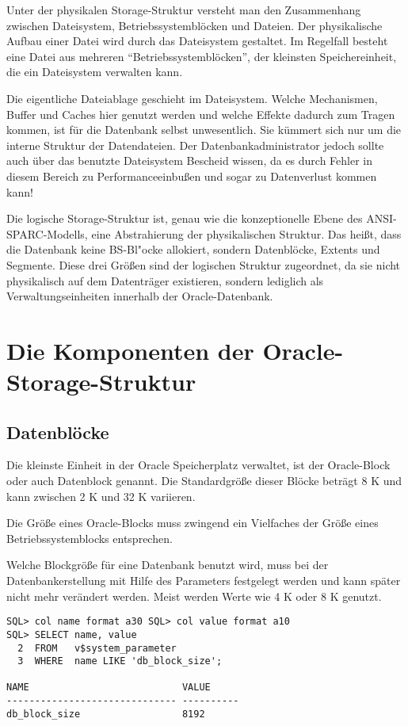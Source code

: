       Unter der physikalen Storage-Struktur versteht man den Zusammenhang zwischen Dateisystem, Betriebssystembl\"ocken und Dateien. Der physikalische Aufbau einer Datei wird durch das Dateisystem gestaltet. Im Regelfall besteht eine Datei aus mehreren \enquote{Betriebssystembl\"ocken}, der kleinsten Speichereinheit, die ein Dateisystem verwalten kann.
      \begin{merke}
        Die eigentliche Dateiablage geschieht im Dateisystem. Welche Mechanismen, Buffer und Caches hier genutzt werden und welche Effekte dadurch zum Tragen kommen, ist f\"ur die Datenbank selbst unwesentlich. Sie k\"ummert sich nur um die interne Struktur der Datendateien. Der Datenbankadministrator jedoch sollte auch \"uber das benutzte Dateisystem Bescheid wissen, da es durch Fehler in diesem Bereich zu Performance\-einbu\ss{}en und sogar zu Datenverlust kommen kann!
      \end{merke}
      Die logische Storage-Struktur ist, genau wie die konzeptionelle Ebene des ANSI-SPARC-Modells, eine Abstrahierung der physikalischen Struktur. Das  hei\ss{}t, dass die Datenbank keine BS-Bl"ocke allokiert, sondern Datenbl\"ocke, Extents und Segmente. Diese drei Gr\"o\ss{}en sind der logischen Struktur zugeordnet, da sie nicht physikalisch auf dem Datentr\"ager existieren, sondern lediglich als Verwaltungseinheiten innerhalb der Oracle-Datenbank.
    \section{Die Komponenten der Oracle-Storage-Struktur}
      \subsection{Datenbl\"ocke}
        Die kleinste Einheit in der Oracle Speicherplatz verwaltet, ist der Oracle-Block oder auch Datenblock genannt. Die Standardgr\"o\ss{}e dieser Bl\"ocke betr\"agt 8 K und kann zwischen 2 K und 32 K variieren.
        \begin{merke}
          Die Gr\"o\ss{}e eines Oracle-Blocks muss zwingend ein Vielfaches der Gr\"o\ss{}e eines  Betriebssystemblocks entsprechen.
        \end{merke}
        Welche Blockgr\"o\ss{}e f\"ur eine Datenbank benutzt wird, muss bei der Datenbankerstellung mit Hilfe des Parameters  festgelegt werden und kann sp\"ater nicht mehr ver\"andert werden. Meist werden Werte wie 4 K oder 8 K genutzt.
        \begin{lstlisting}[caption={Der Parameter \parameter{db\_block\_size}},label=admin100,language=oracle_sql,alsolanguage=sqlplus]
SQL> col name format a30 SQL> col value format a10
SQL> SELECT name, value
  2  FROM   v$system_parameter
  3  WHERE  name LIKE 'db_block_size';

NAME                           VALUE
------------------------------ ----------
db_block_size                  8192
        \end{lstlisting}
